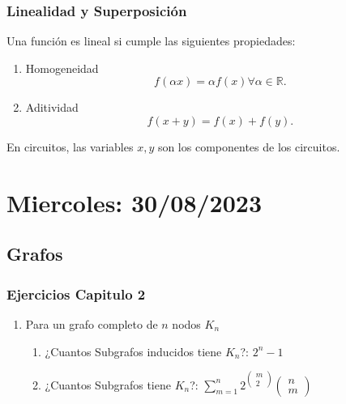 \documentclass{report}
\begin{document}

      \subsection{Linealidad y Superposición} Una función es lineal si cumple las siguientes propiedades:
      \begin{enumerate}
        \item Homogeneidad \[
	    f\left( \alpha x \right) = \alpha f\left( x \right) \forall \alpha \in \mathbb{R}
        .\]
      \item Aditividad \[
      f\left( x+y \right) = f\left( x \right) + f\left( y \right)
      .\]
      \end{enumerate}

      En circuitos, las variables $x,y$ son los componentes de los circuitos.


      \chapter{Miercoles: 30/08/2023}
      \section{Grafos}
      \subsection{Ejercicios Capitulo 2}
      \begin{enumerate}
        \item Para un grafo completo de $n$ nodos $K_n$
	  \begin{enumerate}
	    \item ¿Cuantos Subgrafos inducidos tiene $K_n$?: $2^{n}-1$
	    \item ¿Cuantos Subgrafos tiene $K_{n}$?: $\displaystyle \sum_{m=1}^{n} 2^{\begin{pmatrix} m\\2 \end{pmatrix} }\begin{pmatrix} n\\m \end{pmatrix} $
	  \end{enumerate}
      \end{enumerate}
\end{document}
